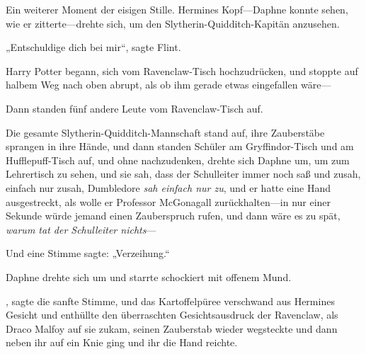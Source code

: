 Ein weiterer Moment der eisigen Stille. Hermines Kopf—Daphne konnte sehen, wie er zitterte—drehte sich, um den Slytherin-Quidditch-Kapitän anzusehen.

„Entschuldige dich bei mir“, sagte Flint.

Harry Potter begann, sich vom Ravenclaw-Tisch hochzudrücken, und stoppte auf halbem Weg nach oben abrupt, als ob ihm gerade etwas eingefallen wäre—

Dann standen fünf andere Leute vom Ravenclaw-Tisch auf.

Die gesamte Slytherin-Quidditch-Mannschaft stand auf, ihre Zauberstäbe sprangen in ihre Hände, und dann standen Schüler am Gryffindor-Tisch und am Hufflepuff-Tisch auf, und ohne nachzudenken, drehte sich Daphne um, um zum Lehrertisch zu sehen, und sie sah, dass der Schulleiter immer noch saß und zusah, einfach nur zusah, Dumbledore \emph{sah einfach nur zu}, und er hatte eine Hand ausgestreckt, als wolle er Professor McGonagall zurückhalten—in nur einer Sekunde würde jemand einen Zauberspruch rufen, und dann wäre es zu spät, \emph{warum tat der Schulleiter nichts}—

Und eine Stimme sagte: „Verzeihung.“

Daphne drehte sich um und starrte schockiert mit offenem Mund.

, sagte die sanfte Stimme, und das Kartoffelpüree verschwand aus Hermines Gesicht und enthüllte den überraschten Gesichtsausdruck der Ravenclaw, als Draco Malfoy auf sie zukam, seinen Zauberstab wieder wegsteckte und dann neben ihr auf ein Knie ging und ihr die Hand reichte.


